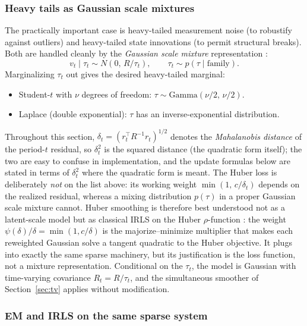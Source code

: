\documentclass[11pt]{article}
\begin{document}
\subsubsection{Heavy tails as Gaussian scale mixtures}

The practically important case is heavy-tailed measurement noise (to
robustify against outliers) and heavy-tailed state innovations (to
permit structural breaks).  Both are handled cleanly by the
\emph{Gaussian scale mixture} representation
\citep{AndrewsMallows1974}:
\begin{equation}
v_t \mid \tau_t \sim N(0,\,R/\tau_t),
\qquad \tau_t \sim p(\tau \mid \text{family}).
\end{equation}
Marginalizing $\tau_t$ out gives the desired heavy-tailed marginal:
\begin{itemize}[leftmargin=2em]
\item Student-$t$ with $\nu$ degrees of freedom: $\tau \sim
  \text{Gamma}(\nu/2,\,\nu/2)$.
\item Laplace (double exponential): $\tau$ has an inverse-exponential
  distribution.
\end{itemize}
Throughout this section, $\delta_t=(r_t^\top R^{-1}r_t)^{1/2}$ denotes
the \emph{Mahalanobis distance} of the period-$t$ residual, so
$\delta_t^2$ is the squared distance (the quadratic form itself); the
two are easy to confuse in implementation, and the update formulas
below are stated in terms of $\delta_t^2$ where the quadratic form is
meant.  The Huber loss is deliberately \emph{not} on the list above:
its working weight $\min(1,\,c/\delta_t)$ depends on the realized
residual, whereas a mixing distribution $p(\tau)$ in a proper Gaussian
scale mixture cannot.  Huber smoothing is therefore best understood
not as a latent-scale model but as classical IRLS on the Huber
$\rho$-function \citep{HollandWelsch1977}: the weight
$\psi(\delta)/\delta=\min(1,c/\delta)$ is the majorize--minimize
multiplier that makes each reweighted Gaussian solve a tangent
quadratic to the Huber objective.  It plugs into exactly the same
sparse machinery, but its justification is the loss function, not a
mixture representation.
Conditional on the $\tau_t$, the model is Gaussian with time-varying
covariance $R_t = R/\tau_t$, and the simultaneous smoother of
Section~\ref{sec:tv} applies without modification.

\subsubsection{EM and IRLS on the same sparse system}
\end{document}

